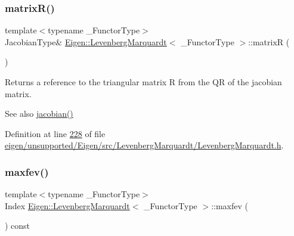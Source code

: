 \mbox{\label{class_eigen_1_1_levenberg_marquardt_afd6cd64fdd7ca32cc71a83d91432ea69}} 
\subsubsection{\texorpdfstring{matrix\+R()}{matrixR()}\hspace{0.1cm}{\footnotesize\ttfamily [2/2]}}
{\footnotesize\ttfamily template$<$typename \+\_\+\+Functor\+Type$>$ \\
Jacobian\+Type\& \hyperlink{class_eigen_1_1_levenberg_marquardt}{Eigen\+::\+Levenberg\+Marquardt}$<$ \+\_\+\+Functor\+Type $>$\+::matrixR (\begin{DoxyParamCaption}{ }\end{DoxyParamCaption})\hspace{0.3cm}{\ttfamily [inline]}}

\begin{DoxyReturn}{Returns}
a reference to the triangular matrix R from the QR of the jacobian matrix. 
\end{DoxyReturn}
\begin{DoxySeeAlso}{See also}
\hyperlink{class_eigen_1_1_levenberg_marquardt_aaf2179310fdf873483f5d8b46f15da8c}{jacobian()} 
\end{DoxySeeAlso}


Definition at line \hyperlink{eigen_2unsupported_2_eigen_2src_2_levenberg_marquardt_2_levenberg_marquardt_8h_source_l00228}{228} of file \hyperlink{eigen_2unsupported_2_eigen_2src_2_levenberg_marquardt_2_levenberg_marquardt_8h_source}{eigen/unsupported/\+Eigen/src/\+Levenberg\+Marquardt/\+Levenberg\+Marquardt.\+h}.

\mbox{\label{class_eigen_1_1_levenberg_marquardt_a495894dde1fedfba97721f6b4a076901}} 
\subsubsection{\texorpdfstring{maxfev()}{maxfev()}\hspace{0.1cm}{\footnotesize\ttfamily [1/2]}}
{\footnotesize\ttfamily template$<$typename \+\_\+\+Functor\+Type$>$ \\
Index \hyperlink{class_eigen_1_1_levenberg_marquardt}{Eigen\+::\+Levenberg\+Marquardt}$<$ \+\_\+\+Functor\+Type $>$\+::maxfev (\begin{DoxyParamCaption}{ }\end{DoxyParamCaption}) const\hspace{0.3cm}{\ttfamily [inline]}}

